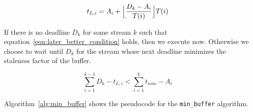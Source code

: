 \begin{equation}
t_{L,i} = A_{i} + \Bigl\lfloor \frac{D_{k}-A_{i}}{T(i)} \Bigr\rfloor T(i)
\label{eqn:last_deadline}
\end{equation}

If there is no deadline $D_{k}$ for some stream $k$ such that equation~\ref{eqn:later_better_condition} holds, then we execute now.  Otherwise we choose to wait
until $D_{k}$ for the stream whose next deadline minimizes the staleness factor of the buffer.


\begin{equation}
\sum_{i=1}^{k-1} D_{k} - t_{L,i} < \sum_{i=1}^{k} t_{now} - A_{i}
\label{eqn:later_better_condition}
\end{equation}

Algorithm~\ref{alg:min_buffer} shows the pseudocode for the \texttt{min\_buffer} algorithm.

